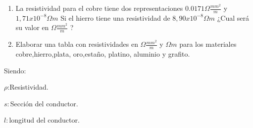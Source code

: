 \documentclass[../main]{subfiles}
\begin{document}
\begin{enumerate}
    \item La resistividad para el cobre tiene dos representaciones $0.0171 \Omega \frac{mm^2}{m}$ y $1,71 x 10^{-8}\Omega m$ Si el hierro tiene una resistividad de $8,90 x 10^{-8}\Omega m$  ¿Cual será su valor en $\Omega \frac{mm^2}{m}$ ?
    \item Elaborar una tabla con resistividades en $\Omega \frac{mm^2}{m}$ y $\Omega m$ para los materiales cobre,hierro,plata, oro,estaño, platino, aluminio y grafito.
    \end{enumerate}

\centering
{}
\vspace{10mm}

Siendo:

$\rho$:Resistividad.

$s:$Sección del conductor.

$l:$longitud del conductor.
\end{document}
